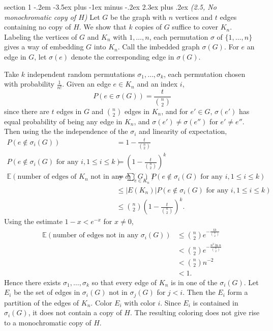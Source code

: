 \documentclass[12pt]{article}
\makeatletter
\theoremstyle{norm}
\newcommand{\E}[0]{\mathbb{E}}
\newcommand{\nin}[0]{\not\in}
\newcommand{\rc}[1]{\frac{1}{#1}}
\newcommand{\si}[0]{\sigma}
\newcommand{\pa}[1]{\left( {#1} \right)}
\newenvironment{problem}{\@startsection
       {section}
       {1}
       {-.2em}
       {-3.5ex plus -1ex minus -.2ex}
       {2.3ex plus .2ex}
       {\pagebreak[3]%
       \large\bf\noindent{Problem }
       }
       }
       {%
       }
\makeatother
\begin{document}
\begin{problem} {\it (2.5, No monochromatic copy of $H$)}
Let $G$ be the graph with $n$ vertices and $t$ edges containing no copy of $H$. 
We show that $k$ copies of $G$ suffice to cover $K_n$. Labeling the vertices of $G$ and $K_n$ with $1,\ldots, n$, each permutation $\si$ of $\{1,\ldots, n\}$ gives a way of embedding $G$ into $K_n$. Call the imbedded graph $\si(G)$. For $e$ an edge in $G$, let $\si(e)$ denote the corresponding edge in $\si(G)$.

Take $k$ independent random permutations $\si_1,\ldots, \si_k$, each permutation chosen with probability $\rc{n!}$. Given an edge $e\in K_n$ and an index $i$,
\[
P(e\in \sigma(G))=\frac{t}{\binom n2}
\]
since there are $t$ edges in $G$ and $\binom n2$ edges in $K_n$, and for $e'\in G$, $\sigma(e')$ has equal probability of being any edge in $K_n$, and $\sigma(e')\neq \si(e'')$ for $e'\neq e''$. Then using the the independence of the $\sigma_i$ and linearity of expectation,
\begin{align*}
P(e\nin \sigma_i(G))&=1-\frac{t}{\binom n2}\\
P(e\nin \sigma_i(G)\text{ for any }i,1\leq i\leq k)&=\pa{1-\frac{t}{\binom n2}}^k\\
\E(\text{number of edges of }K_n\text{ not in any }\sigma_i(G))
&=\sum_{e\in K_n}P(e\nin \sigma_i(G)\text{ for any }i,1\leq i\leq k)\\
&\leq |E(K_n)|P(e\nin \sigma_i(G)\text{ for any }i,1\leq i\leq k)\\
&\leq \binom n2\pa{1-\frac{t}{\binom n2}}^k.
\end{align*}
Using the estimate $1-x<e^{-x}$ for $x\neq 0$, 
\begin{align*}
\E(\text{number of edges not in any }\sigma_i(G))
&\leq \binom n2 e^{-\frac{tk}{\binom n2}}\\
&<\binom n2 e^{-\frac{n^2\ln n}{\binom n2}}\\
&<\binom n2n^{-2}\\
&<1.
\end{align*}
Hence there exists $\sigma_1,\ldots, \sigma_k$ so that every edge of $K_n$ is in one of the $\sigma_i(G)$. Let $E_i$ be the set of edges in $\sigma_i(G)$ not in $\sigma_j(G)$ for $j<i$. Then the $E_i$ form a partition of the edges of $K_n$. Color $E_i$ with color $i$. Since $E_i$ is contained in $\sigma_i(G)$, it does not contain a copy of $H$. The resulting coloring does not give rise to a monochromatic copy of $H$.
\end{problem}
\end{document}

